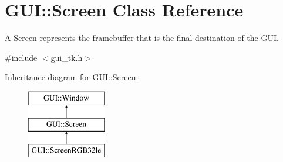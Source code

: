 \hypertarget{classGUI_1_1Screen}{\section{G\-U\-I\-:\-:Screen Class Reference}
\label{classGUI_1_1Screen}
}


A \hyperlink{classGUI_1_1Screen}{Screen} represents the framebuffer that is the final destination of the \hyperlink{namespaceGUI}{G\-U\-I}.  




{\ttfamily \#include $<$gui\-\_\-tk.\-h$>$}

Inheritance diagram for G\-U\-I\-:\-:Screen\-:\begin{figure}[H]
\begin{center}
\leavevmode
\includegraphics[height=3.000000cm]{classGUI_1_1Screen}
\end{center}
\end{figure}
